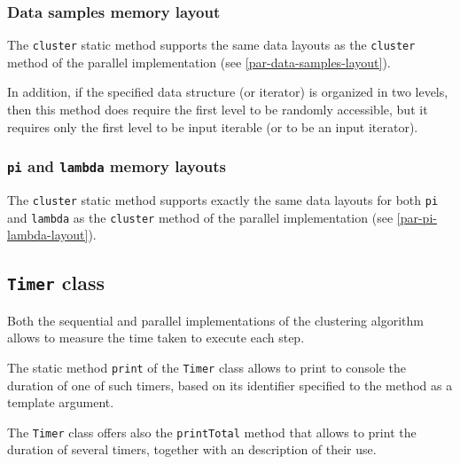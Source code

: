 \documentclass{article}
\begin{document}
\hypertarget{seq-data-samples-layout}{
    \subsubsection{Data samples memory layout}
    \label{seq-data-samples-layout}}

The \texttt{cluster} static method supports the same data layouts as the \texttt{cluster} method
of the parallel implementation (see \ref{par-data-samples-layout}).

In addition, if the specified data structure (or iterator) is organized in two levels, then this
method does require the first level to be randomly accessible, but it requires only the first
level to be input iterable (or to be an input iterator).

\hypertarget{seq-pi-lambda-layout}{
    \subsubsection{\texttt{pi} and \texttt{lambda} memory layouts}
    \label{seq-pi-lambda-layout}}

The \texttt{cluster} static method supports exactly the same data layouts for both \texttt{pi}
and \texttt{lambda} as the \texttt{cluster} method
of the parallel implementation (see \ref{par-pi-lambda-layout}).

\hypertarget{timers}{
    \subsection{\texttt{Timer} class}
    \label{timer}}

Both the sequential and parallel implementations of the clustering algorithm allows to measure
the time taken to execute each step.

The static method \texttt{print} of the \texttt{Timer} class allows to print to console the
duration of one of such timers, based on its identifier specified to the method as a template
argument.

The \texttt{Timer} class offers also the \texttt{printTotal} method that allows to print the
duration of several timers, together with an description of their use.
\end{document}
